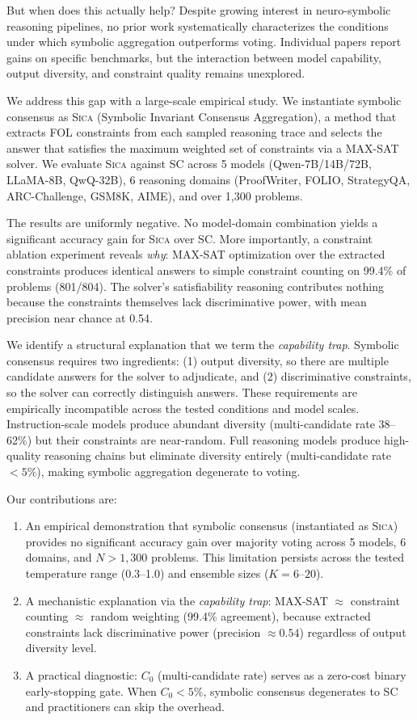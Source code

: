 \documentclass[11pt,a4paper]{article}
\newcommand{\sica}{\textsc{Sica}}
\newcommand{\czero}{C_0}
\begin{document}
But when does this actually help? Despite growing interest in neuro-symbolic reasoning pipelines, no prior work systematically characterizes the conditions under which symbolic aggregation outperforms voting. Individual papers report gains on specific benchmarks, but the interaction between model capability, output diversity, and constraint quality remains unexplored.

We address this gap with a large-scale empirical study. We instantiate symbolic consensus as \sica{} (Symbolic Invariant Consensus Aggregation), a method that extracts FOL constraints from each sampled reasoning trace and selects the answer that satisfies the maximum weighted set of constraints via a MAX-SAT solver. We evaluate \sica{} against SC across 5 models (Qwen-7B/14B/72B, LLaMA-8B, QwQ-32B), 6 reasoning domains (ProofWriter, FOLIO, StrategyQA, ARC-Challenge, GSM8K, AIME), and over 1,300 problems.

The results are uniformly negative. No model-domain combination yields a significant accuracy gain for \sica{} over SC. More importantly, a constraint ablation experiment reveals \emph{why}: MAX-SAT optimization over the extracted constraints produces identical answers to simple constraint counting on 99.4\% of problems (801/804). The solver's satisfiability reasoning contributes nothing because the constraints themselves lack discriminative power, with mean precision near chance at 0.54.

We identify a structural explanation that we term the \emph{capability trap}. Symbolic consensus requires two ingredients: (1) output diversity, so there are multiple candidate answers for the solver to adjudicate, and (2) discriminative constraints, so the solver can correctly distinguish answers. These requirements are empirically incompatible across the tested conditions and model scales. Instruction-scale models produce abundant diversity (multi-candidate rate 38--62\%) but their constraints are near-random. Full reasoning models produce high-quality reasoning chains but eliminate diversity entirely (multi-candidate rate $<5\%$), making symbolic aggregation degenerate to voting.

Our contributions are:
\begin{enumerate}[nosep]
  \item An empirical demonstration that symbolic consensus (instantiated as \sica{}) provides no significant accuracy gain over majority voting across 5 models, 6 domains, and $N > 1{,}300$ problems. This limitation persists across the tested temperature range (0.3--1.0) and ensemble sizes ($K = 6$--$20$).
  \item A mechanistic explanation via the \emph{capability trap}: MAX-SAT $\approx$ constraint counting $\approx$ random weighting (99.4\% agreement), because extracted constraints lack discriminative power (precision $\approx 0.54$) regardless of output diversity level.
  \item A practical diagnostic: $\czero$ (multi-candidate rate) serves as a zero-cost binary early-stopping gate. When $\czero < 5\%$, symbolic consensus degenerates to SC and practitioners can skip the overhead.
\end{enumerate}
\end{document}
